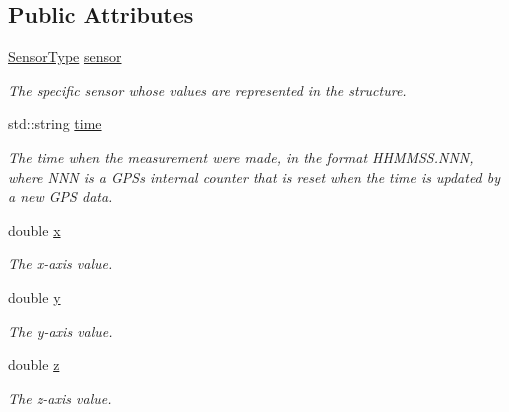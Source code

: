 \subsection*{Public Attributes}
\begin{DoxyCompactItemize}
\item 
\mbox{\label{structData3D_adf9870c0bad9cadb351fc191110549ce}} 
\hyperlink{structData3D_a1b38ab89b23a0b2b309671ac9281a2ac}{Sensor\+Type} \hyperlink{structData3D_adf9870c0bad9cadb351fc191110549ce}{sensor}
\begin{DoxyCompactList}\small\item\em The specific sensor whose values are represented in the structure. \end{DoxyCompactList}\item 
\mbox{\label{structData3D_a566d9370452a647cceea530cee5bb62a}} 
std\+::string \hyperlink{structData3D_a566d9370452a647cceea530cee5bb62a}{time}
\begin{DoxyCompactList}\small\item\em The time when the measurement were made, in the format H\+H\+M\+M\+S\+S.\+N\+NN, where N\+NN is a G\+PS\textquotesingle{}s internal counter that is reset when the time is updated by a new G\+PS data. \end{DoxyCompactList}\item 
\mbox{\label{structData3D_ae8b4e2391802fc2e8b063274e6c0828e}} 
double \hyperlink{structData3D_ae8b4e2391802fc2e8b063274e6c0828e}{x}
\begin{DoxyCompactList}\small\item\em The x-\/axis value. \end{DoxyCompactList}\item 
\mbox{\label{structData3D_a265d0776c17fba2cc402061b41853ebc}} 
double \hyperlink{structData3D_a265d0776c17fba2cc402061b41853ebc}{y}
\begin{DoxyCompactList}\small\item\em The y-\/axis value. \end{DoxyCompactList}\item 
\mbox{\label{structData3D_a561037592c0c27d385ddeaeb7a61f864}} 
double \hyperlink{structData3D_a561037592c0c27d385ddeaeb7a61f864}{z}
\begin{DoxyCompactList}\small\item\em The z-\/axis value. \end{DoxyCompactList}\end{DoxyCompactItemize}


